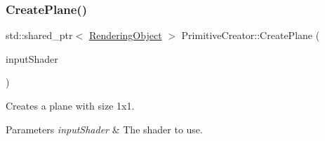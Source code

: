 \subsubsection{\texorpdfstring{Create\+Plane()}{CreatePlane()}}
{\footnotesize\ttfamily std\+::shared\+\_\+ptr$<$ \hyperlink{class_rendering_object}{Rendering\+Object} $>$ Primitive\+Creator\+::\+Create\+Plane (\begin{DoxyParamCaption}\item[{std\+::shared\+\_\+ptr$<$ \hyperlink{class_shader_program}{Shader\+Program} $>$}]{input\+Shader }\end{DoxyParamCaption})}



Creates a plane with size 1x1. 


\begin{DoxyParams}{Parameters}
{\em input\+Shader} & The shader to use. \\
\hline
\end{DoxyParams}
